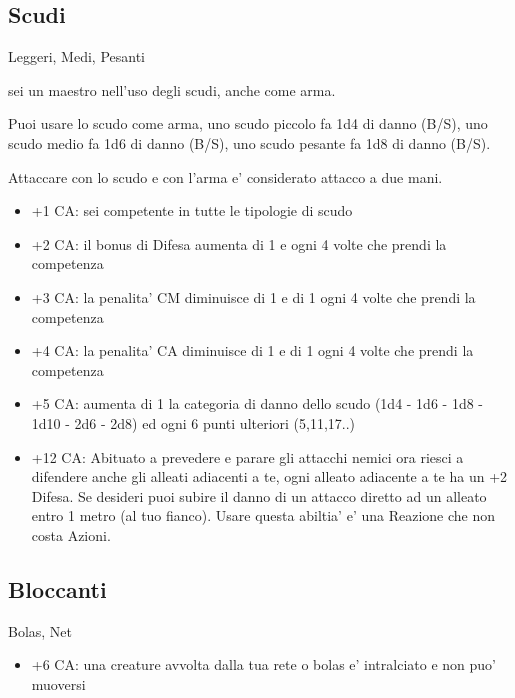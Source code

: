 \documentclass[a4paper,11pt,twoside,openany]{book}
\begin{document}
	\subsection{Scudi} Leggeri, Medi, Pesanti
	
	sei un maestro nell'uso degli scudi, anche come arma.
	
	Puoi usare lo scudo come arma, uno scudo piccolo fa 1d4 di danno (B/S), uno scudo medio fa 1d6 di danno (B/S), uno scudo pesante fa 1d8 di danno (B/S).
	
	Attaccare con lo scudo e con l'arma e' considerato attacco a due mani.
	
	\begin{itemize}
		\item +1 CA: sei competente in tutte le tipologie di scudo
		
		\item +2 CA: il bonus di Difesa aumenta di 1 e ogni 4 volte che prendi la competenza
		
		\item +3 CA: la penalita' CM diminuisce di 1 e di 1 ogni 4 volte che prendi la competenza
		
		\item +4 CA: la penalita' CA diminuisce di 1 e di 1 ogni 4 volte che prendi la competenza
		
		\item +5 CA: aumenta di 1 la categoria di danno dello scudo (1d4 - 1d6 - 1d8 - 1d10 - 2d6 - 2d8) ed ogni 6 punti ulteriori (5,11,17..)
		
		\item +12 CA: Abituato a prevedere e parare gli attacchi nemici ora riesci a difendere anche gli alleati adiacenti a te, ogni alleato adiacente a te ha un +2 Difesa. Se desideri puoi subire il danno di un attacco diretto ad un alleato entro 1 metro (al tuo fianco). Usare questa abiltia' e' una Reazione che non costa Azioni.
		
	\end{itemize}
	
	\subsection{Bloccanti} Bolas, Net
	
	\begin{itemize}
		\item +6 CA: una creature avvolta dalla tua rete o bolas e' intralciato
		e non puo' muoversi
		
	\end{itemize}
	
\end{document}
